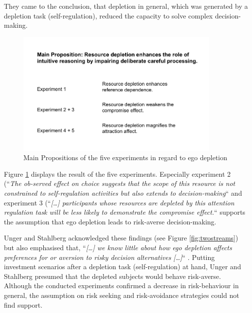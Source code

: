 They came to the conclusion, that depletion in general, which was generated by a depletion task (self-regulation), reduced the capacity to solve complex decision-making.\par
\begin{figure}[h!]
\center
	\includegraphics[width=0.9\textwidth]{images/mainpropositions.png}
  \caption{Main Propositions of the five experiments in regard to ego depletion \citep{pocheptsova2009deciding}}\label{fig:mainpropositions}
\end{figure}
Figure \ref{fig:mainpropositions} displays the result of the five experiments. Especially experiment 2 (“\emph{The ob-served effect on choice suggests that the scope of this resource is not constrained to self-regulation activities but also extends to decision-making}“ \citep[p.~350]{pocheptsova2009deciding} and experiment 3 (“\emph{[\ldots] participants whose resources are depleted by this attention regulation task will be less likely to demonstrate the compromise effect.}“ \citep[p.~350]{pocheptsova2009deciding} supports the assumption that ego depletion leads to risk-averse decision-making.\par
Unger and Stahlberg acknowledged these findings (see Figure \ref{fig:twostreams}) but also emphasised that, “\emph{[\ldots] we know little about how ego depletion affects preferences for or aversion to risky decision alternatives [\ldots]}“ \citep[p.~29]{unger2011ego}. Putting investment scenarios after a depletion task (self-regulation) at hand, Unger and Stahlberg presumed that the depleted subjects would behave risk-averse. Although the conducted experiments confirmed a decrease in risk-behaviour in general, the assumption on risk seeking and risk-avoidance strategies could not find support. 

